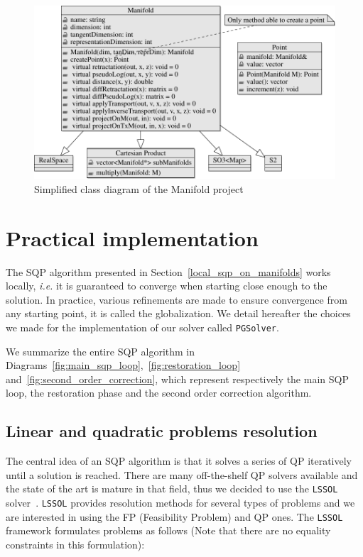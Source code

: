 \begin{figure}[htpb]
  \centering
  \includegraphics[width=\linewidth]{uml/manifolds-1.pdf}
  \caption{Simplified class diagram of the Manifold project}
\label{fig:uml_manifold}
\end{figure}

\section{Practical implementation}
\label{sec:practical_implementation}

The SQP algorithm presented in Section~\ref{local_sqp_on_manifolds} works locally, \emph{i.e.} it is guaranteed to converge when starting close enough to the solution.
In practice, various refinements are made to ensure convergence from any starting point, it is called the globalization.
We detail hereafter the choices we made for the implementation of our solver called {\tt PGSolver}.

We summarize the entire SQP algorithm in Diagrams~\ref{fig:main_sqp_loop},~\ref{fig:restoration_loop} and~\ref{fig:second_order_correction}, which represent respectively the main SQP loop, the restoration phase and the second order correction algorithm.

\subsection{Linear and quadratic problems resolution}
\label{sub:linear_and_quadratic_problems_resolution}

The central idea of an SQP algorithm is that it solves a series of QP iteratively until a solution is reached.
There are many off-the-shelf QP solvers available and the state of the art is mature in that field, thus we decided to use the {\tt LSSOL} solver~\cite{gill:techrep:1986}.
{\tt LSSOL} provides resolution methods for several types of problems and we are interested in using the FP (Feasibility Problem) and QP ones.\@
The {\tt LSSOL} framework formulates problems as follows (Note that there are no equality constraints in this formulation):

